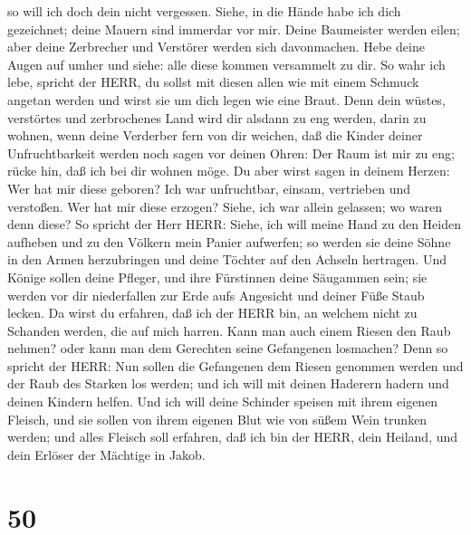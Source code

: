 so will ich doch dein nicht vergessen.  Siehe, in die Hände
habe ich dich gezeichnet; deine Mauern sind immerdar vor mir.
 Deine Baumeister werden eilen; aber deine Zerbrecher und
Verstörer werden sich davonmachen.  Hebe deine Augen auf
umher und siehe: alle diese kommen versammelt zu dir. So wahr ich lebe,
spricht der HERR, du sollst mit diesen allen wie mit einem Schmuck
angetan werden und wirst sie um dich legen wie eine Braut. 
Denn dein wüstes, verstörtes und zerbrochenes Land wird dir alsdann zu
eng werden, darin zu wohnen, wenn deine Verderber fern von dir weichen,
 daß die Kinder deiner Unfruchtbarkeit werden noch sagen
vor deinen Ohren: Der Raum ist mir zu eng; rücke hin, daß ich bei dir
wohnen möge.  Du aber wirst sagen in deinem Herzen: Wer hat
mir diese geboren? Ich war unfruchtbar, einsam, vertrieben und
verstoßen. Wer hat mir diese erzogen? Siehe, ich war allein gelassen; wo
waren denn diese?  So spricht der Herr HERR: Siehe, ich
will meine Hand zu den Heiden aufheben und zu den Völkern mein Panier
aufwerfen; so werden sie deine Söhne in den Armen herzubringen und deine
Töchter auf den Achseln hertragen.  Und Könige sollen deine
Pfleger, und ihre Fürstinnen deine Säugammen sein; sie werden vor dir
niederfallen zur Erde aufs Angesicht und deiner Füße Staub lecken. Da
wirst du erfahren, daß ich der HERR bin, an welchem nicht zu Schanden
werden, die auf mich harren.  Kann man auch einem Riesen
den Raub nehmen? oder kann man dem Gerechten seine Gefangenen losmachen?
 Denn so spricht der HERR: Nun sollen die Gefangenen dem
Riesen genommen werden und der Raub des Starken los werden; und ich will
mit deinen Haderern hadern und deinen Kindern helfen.  Und
ich will deine Schinder speisen mit ihrem eigenen Fleisch, und sie
sollen von ihrem eigenen Blut wie von süßem Wein trunken werden; und
alles Fleisch soll erfahren, daß ich bin der HERR, dein Heiland, und
dein Erlöser der Mächtige in Jakob.

\hypertarget{section-49}{%
\section{50}\label{section-49}}

